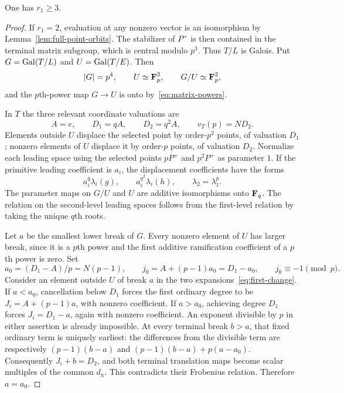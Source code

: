 \begin{lemma}\label{lem:three-first-dimensions}
One has $r_1\ge3$.
\end{lemma}
\begin{proof}
If $r_1=2$, evaluation at any nonzero vector is an isomorphism by Lemma~\ref{lem:full-point-orbits}. The stabilizer of $P^+$ is then contained in the terminal matrix subgroup, which is central modulo $p^3$. Thus $T/L$ is Galois. Put $G=\operatorname{Gal}(T/L)$ and $U=\operatorname{Gal}(T/E)$. Then
\[
               |G|=p^4,\qquad U\simeq\mathbf F_p^2,
                    \qquad G/U\simeq\mathbf F_p^2,
\]
and the $p$th-power map $G\to U$ is onto by~\eqref{eq:matrix-powers}.

In $T$ the three relevant coordinate valuations are
\[
 A=e,\qquad D_1=qA,\qquad D_2=q^2A,\qquad v_T(p)=ND_2.
\]
Elements outside $U$ displace the selected point by order-$p^2$ points, of valuation $D_1$; nonzero elements of $U$ displace it by order-$p$ points, of valuation $D_2$. Normalize each leading space using the selected points $pP^+$ and $p^2P^+$ as parameter $1$. If the primitive leading coefficient is $a_i$, the displacement coefficients have the forms
\[
            a_i^q\lambda_i(g),\qquad a_i^{q^2}\lambda_i(h),
                        \qquad\lambda_2=\lambda_1^p.
\]
The parameter maps on $G/U$ and $U$ are additive isomorphisms onto $\mathbf F_q$. The relation on the second-level leading spaces follows from the first-level relation by taking the unique $q$th roots.

Let $a$ be the smallest lower break of $G$. Every nonzero element of $U$ has larger break, since it is a $p$th power and the first additive ramification coefficient of a $p$th power is zero. Set
\[
 a_0=(D_1-A)/p=N(p-1),\qquad
 j_0=A+(p-1)a_0=D_1-a_0,\qquad j_0\equiv-1\pmod p.
\]
Consider an element outside $U$ of break $a$ in the two expansions~\eqref{eq:first-change}. If $a<a_0$, cancellation below $D_1$ forces the first ordinary degree to be $J_i=A+(p-1)a$, with nonzero coefficient. If $a>a_0$, achieving degree $D_1$ forces $J_i=D_1-a$, again with nonzero coefficient. An exponent divisible by $p$ in either assertion is already impossible. At every terminal break $b>a$, that fixed ordinary term is uniquely earliest: the differences from the divisible term are respectively $(p-1)(b-a)$ and $(p-1)(b-a)+p(a-a_0)$. Consequently $J_i+b=D_2$, and both terminal translation maps become scalar multiples of the common $d_h$. This contradicts their Frobenius relation. Therefore $a=a_0$.


\end{proof}
